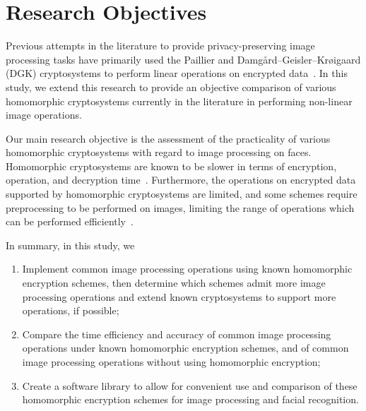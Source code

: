 \section{Research Objectives}

Previous attempts in the literature to provide privacy-preserving image processing tasks have primarily used the Paillier and  Damg{\aa}rd--Geisler--Kr{\o}igaard (DGK) cryptosystems to perform linear operations on encrypted data~\cite{ziad_cryptoimg:_2016,hutchison_privacy-preserving_2009}. In this study, we extend this research to provide an objective comparison of various homomorphic cryptosystems currently in the literature in performing non-linear image operations.

Our main research objective is the assessment of the practicality of various homomorphic cryptosystems with regard to image processing on faces. Homomorphic cryptosystems are known to be slower in terms of encryption, operation, and decryption time~\cite{sen_homomorphic_2013}. Furthermore, the operations on encrypted data supported by homomorphic cryptosystems are limited, and some schemes require preprocessing to be performed on images, limiting the range of operations which can be performed efficiently~\cite{li_elliptic_2012}.

In summary, in this study, we 
\begin{enumerate}
    \item Implement common image processing operations using known homomorphic encryption schemes, then determine which schemes admit more image processing operations and extend known cryptosystems to support more operations, if possible;
    \item Compare the time efficiency and accuracy of common image processing operations under known homomorphic encryption schemes, and of common image processing operations without using homomorphic encryption;
    \item Create a software library to allow for convenient use and comparison of these homomorphic encryption schemes for image processing and facial recognition.
\end{enumerate}
